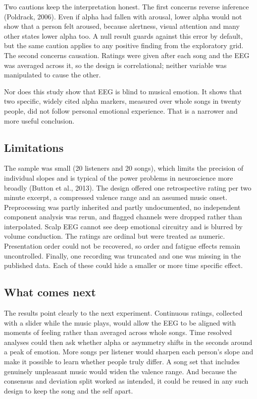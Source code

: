 \documentclass[11pt,a4paper]{article}
\begin{document}
Two cautions keep the interpretation honest. The first concerns reverse inference (Poldrack, 2006). Even if alpha had fallen with arousal, lower alpha would not show that a person felt aroused, because alertness, visual attention and many other states lower alpha too. A null result guards against this error by default, but the same caution applies to any positive finding from the exploratory grid. The second concerns causation. Ratings were given after each song and the EEG was averaged across it, so the design is correlational; neither variable was manipulated to cause the other.

Nor does this study show that EEG is blind to musical emotion. It shows that two specific, widely cited alpha markers, measured over whole songs in twenty people, did not follow personal emotional experience. That is a narrower and more useful conclusion.

\subsection{Limitations}

The sample was small (20 listeners and 20 songs), which limits the precision of individual slopes and is typical of the power problems in neuroscience more broadly (Button et al., 2013). The design offered one retrospective rating per two minute excerpt, a compressed valence range and an assumed music onset. Preprocessing was partly inherited and partly undocumented, no independent component analysis was rerun, and flagged channels were dropped rather than interpolated. Scalp EEG cannot see deep emotional circuitry and is blurred by volume conduction. The ratings are ordinal but were treated as numeric. Presentation order could not be recovered, so order and fatigue effects remain uncontrolled. Finally, one recording was truncated and one was missing in the published data. Each of these could hide a smaller or more time specific effect.

\subsection{What comes next}

The results point clearly to the next experiment. Continuous ratings, collected with a slider while the music plays, would allow the EEG to be aligned with moments of feeling rather than averaged across whole songs. Time resolved analyses could then ask whether alpha or asymmetry shifts in the seconds around a peak of emotion. More songs per listener would sharpen each person's slope and make it possible to learn whether people truly differ. A song set that includes genuinely unpleasant music would widen the valence range. And because the consensus and deviation split worked as intended, it could be reused in any such design to keep the song and the self apart.
\end{document}
